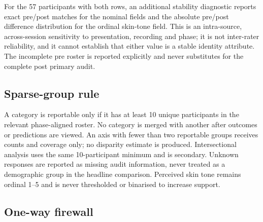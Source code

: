 For the 57 participants with both rows, an additional stability diagnostic reports exact
pre/post matches for the nominal fields and the absolute pre/post difference distribution for the
ordinal skin-tone field. This is an intra-source, across-session sensitivity to presentation,
recording and phase; it is not inter-rater reliability, and it cannot establish that either value
is a stable identity attribute. The incomplete pre roster is reported explicitly and never
substitutes for the complete post primary audit.

\subsection{Sparse-group rule}

A category is reportable only if it has at least 10 unique participants in the relevant
phase-aligned roster. No category is merged with another after outcomes or predictions are
viewed. An axis with fewer than two reportable groups receives counts and coverage only; no
disparity estimate is produced. Intersectional analysis uses the same 10-participant minimum and
is secondary. Unknown responses are reported as missing audit information, never treated as a
demographic group in the headline comparison. Perceived skin tone remains ordinal 1--5 and is
never thresholded or binarised to increase support.

\subsection{One-way firewall}

